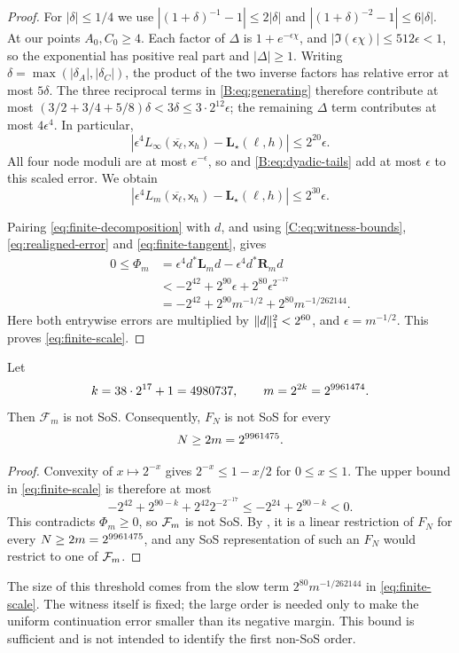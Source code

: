 \begin{proof}
For $|\delta|\le1/4$ we use
$|(1+\delta)^{-1}-1|\le2|\delta|$ and
$|(1+\delta)^{-2}-1|\le6|\delta|$.
At our points $A_0,C_0\ge4$. Each factor of $\Delta$ is
$1+e^{-\epsilon\chi}$, and $|\Im(\epsilon\chi)|\le512\epsilon<1$,
so the exponential has positive real part and $|\Delta|\ge1$.
Writing $\delta=\max(|\delta_A|,|\delta_C|)$, the product of the two
inverse factors has relative error at most $5\delta$. The three reciprocal
terms in \eqref{B:eq:generating} therefore contribute at most
$(3/2+3/4+5/8)\delta<3\delta\le3\cdot2^{12}\epsilon$; the remaining
$\Delta$ term contributes at most $4\epsilon^4$. In particular,
\[
 |\epsilon^4 L_\infty(\overline{\mathsf x_\ell},\mathsf x_h)-\mathbf L_\star(\ell,h)|
 \le2^{20}\epsilon.
\]
All four node moduli are at most $e^{-\epsilon}$, so
 and \eqref{B:eq:dyadic-tails} add at most
$\epsilon$ to this scaled error. We obtain
\begin{equation}\label{eq:finite-tangent}
 |\epsilon^4 L_m(\overline{\mathsf x_\ell},\mathsf x_h)-\mathbf L_\star(\ell,h)|
 \le2^{30}\epsilon.
\end{equation}

Pairing \eqref{eq:finite-decomposition} with $d$, and using
\eqref{C:eq:witness-bounds}, \eqref{eq:realigned-error} and
\eqref{eq:finite-tangent}, gives
\begin{align*}
 0\le\Phi_m
 &=\epsilon^4d^*\mathbf L_md-\epsilon^4d^*\mathbf R_md\\
 &<-2^{42}+2^{90}\epsilon+2^{80}\epsilon^{2^{-17}}\\
 &=-2^{42}+2^{90}m^{-1/2}+2^{80}m^{-1/262144}.
\end{align*}
Here both entrywise errors are multiplied by
$\lVert d\rVert_1^2<2^{60}$, and $\epsilon=m^{-1/2}$.
This proves \eqref{eq:finite-scale}.
\end{proof}

\begin{proposition}\label{prop:explicit-threshold}
Let
\[
 k=38\cdot2^{17}+1=\ScaleExponent,\qquad
 m=2^{2k}=\CornerDepth.
\]
Then $\mathcal F_m$ is not SoS. Consequently, $F_N$ is not SoS for
every
\[
                       N\ge2m=2^{9961475}.
\]
\end{proposition}
\begin{proof}
Convexity of $x\mapsto2^{-x}$ gives
$2^{-x}\le1-x/2$ for $0\le x\le1$. The upper bound in
\eqref{eq:finite-scale} is therefore at most
\[
 -2^{42}+2^{90-k}+2^{42}2^{-2^{-17}}
 \le-2^{24}+2^{90-k}<0.
\]
This contradicts $\Phi_m\ge0$, so $\mathcal{F}_m$ is not SoS. By
, it is a linear restriction of $F_N$ for every
$N\ge2m=2^{9961475}$, and any SoS representation of such an
$F_N$ would restrict to one of $\mathcal{F}_m$.
\end{proof}

The size of this threshold comes from the slow term
$2^{80}m^{-1/262144}$ in \eqref{eq:finite-scale}. The witness itself is
fixed; the large order is needed only to make the uniform continuation
error smaller than its negative margin. This bound is sufficient and is
not intended to identify the first non-SoS order.
